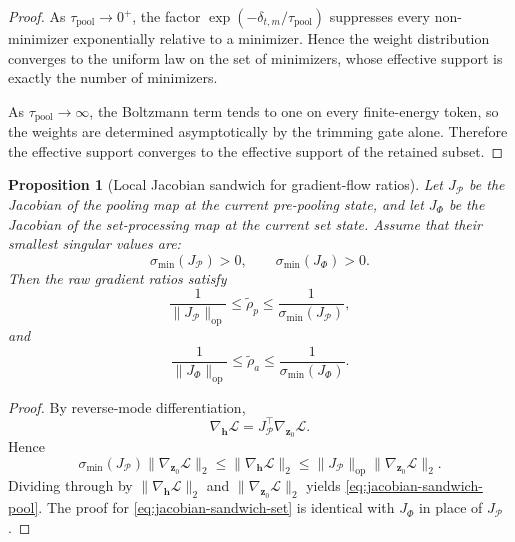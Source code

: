 \documentclass{article}
\theoremstyle{plain}
\newtheorem{proposition}[theorem]{Proposition}
\theoremstyle{definition}
\theoremstyle{remark}
\begin{document}
\begin{proof}
As $\tau_{\mathrm{pool}}\to 0^+$, the factor $\exp(-\delta_{t,m}/\tau_{\mathrm{pool}})$ suppresses every non-minimizer exponentially relative to a minimizer. Hence the weight distribution converges to the uniform law on the set of minimizers, whose effective support is exactly the number of minimizers.

As $\tau_{\mathrm{pool}}\to \infty$, the Boltzmann term tends to one on every finite-energy token, so the weights are determined asymptotically by the trimming gate alone. Therefore the effective support converges to the effective support of the retained subset.
\end{proof}

\begin{proposition}[Local Jacobian sandwich for gradient-flow ratios]
\label{prop:jacobian-sandwich}
Let $J_{\mathcal{P}}$ be the Jacobian of the pooling map at the current pre-pooling state, and let $J_{\Phi}$ be the Jacobian of the set-processing map at the current set state. Assume that their smallest singular values are:
\[
\sigma_{\min}(J_{\mathcal{P}})>0,
\qquad
\sigma_{\min}(J_{\Phi})>0.
\]
Then the raw gradient ratios satisfy
\begin{equation}
\label{eq:jacobian-sandwich-pool}
\frac{1}{\|J_{\mathcal{P}}\|_{\mathrm{op}}}
\le
\tilde\rho_p
\le
\frac{1}{\sigma_{\min}(J_{\mathcal{P}})},
\end{equation}
and
\begin{equation}
\label{eq:jacobian-sandwich-set}
\frac{1}{\|J_{\Phi}\|_{\mathrm{op}}}
\le
\tilde\rho_a
\le
\frac{1}{\sigma_{\min}(J_{\Phi})}.
\end{equation}
\end{proposition}

\begin{proof}
By reverse-mode differentiation,
\[
\nabla_{\mathbf{h}}\mathcal{L}
=
J_{\mathcal{P}}^{\top}\nabla_{\mathbf{z}_0}\mathcal{L}.
\]
Hence
\[
\sigma_{\min}(J_{\mathcal{P}})\|\nabla_{\mathbf{z}_0}\mathcal{L}\|_2
\le
\|\nabla_{\mathbf{h}}\mathcal{L}\|_2
\le
\|J_{\mathcal{P}}\|_{\mathrm{op}}
\|\nabla_{\mathbf{z}_0}\mathcal{L}\|_2.
\]
Dividing through by $\|\nabla_{\mathbf{h}}\mathcal{L}\|_2$ and $\|\nabla_{\mathbf{z}_0}\mathcal{L}\|_2$ yields \eqref{eq:jacobian-sandwich-pool}. The proof for \eqref{eq:jacobian-sandwich-set} is identical with $J_{\Phi}$ in place of $J_{\mathcal{P}}$.
\end{proof}

\end{document}

